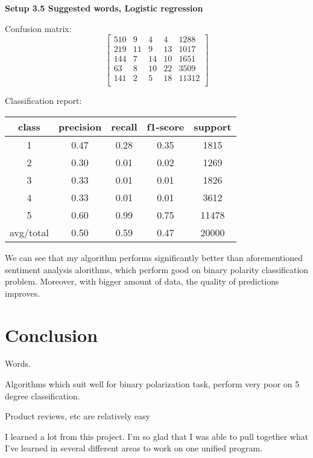 \documentclass[12pt]{report}
\begin{document}
\textbf{Setup 3.5 Suggested words, Logistic regression}

Confusion matrix:
\[
\begin{bmatrix}
510 & 9 & 4 & 4 & 1288 \\
219 & 11 & 9 & 13 & 1017 \\
144 & 7 & 14 & 10 & 1651 \\
63 & 8 & 10 & 22 & 3509 \\
141 & 2 & 5 & 18 & 11312 \\
\end{bmatrix}
\]

Classification report:

\begin{center}
	\begin{tabular}{c | c | c | c | c }
		\hline
		class & precision & recall & f1-score & support \\ \hline
		1 & 0.47 & 0.28 & 0.35 & 1815 \\ \hline
		2 & 0.30 & 0.01 & 0.02 & 1269 \\ \hline
		3 & 0.33 & 0.01 & 0.01 & 1826 \\ \hline
		4 & 0.33 & 0.01 & 0.01 & 3612 \\ \hline
		5 & 0.60 & 0.99 & 0.75 & 11478 \\ \hline
		avg/total & 0.50 & 0.59 & 0.47 & 20000 \\ \hline
	\end{tabular}
\end{center}

We can see that my algorithm performs significantly better than aforementioned sentiment analysis alorithms, which perform good on binary polarity classification problem. Moreover, with bigger amount of data, the quality of predictions improves.

\newpage

\chapter*{Conclusion}

Words.

Algorithms which suit well for binary polarization task, perform very poor on 5 degree classification.

Product reviews, etc are relatively easy

I learned a lot from this project. I’m so glad that I was able to pull together what I’ve learned in several different areas to work on one unified program.
\end{document}
